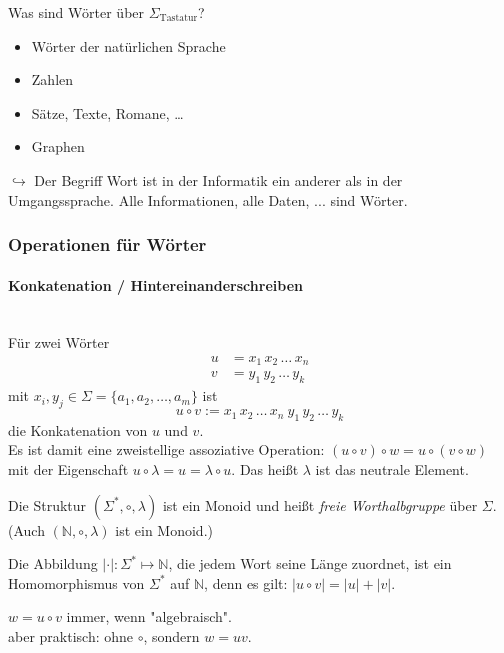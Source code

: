 \documentclass[runningheads,deutsch]{llncs}
\begin{document}
\begin{remark}
    Was sind Wörter über $\Sigma_{\text{Tastatur}}$?
    \begin{itemize}
        \renewcommand{\labelitemi}{$\rightarrow$}
        \item Wörter der natürlichen Sprache
        \item Zahlen
        \item Sätze, Texte, Romane, \dots 
        \item Graphen
    \end{itemize}
    $\hookrightarrow$ Der Begriff Wort ist in der Informatik ein anderer als in der Umgangssprache. Alle Informationen, alle Daten, ... sind Wörter.
\end{remark}

\pagebreak

\subsubsection{Operationen für Wörter}
\paragraph{Konkatenation / Hintereinanderschreiben}\phantom{ }\\
    Für zwei Wörter
    \begin{align*}
        u &= x_1\, x_2\, \dots\, x_n \\
        v &= y_1\, y_2\, \dots\, y_k
    \end{align*}
    mit $x_i, y_j \in \Sigma = \{ a_1, a_2, \dots, a_m \}$ ist
    \[ u \circ v := x_1\, x_2\, \dots\, x_n\  y_1\, y_2\, \dots\, y_k \]
    die Konkatenation von $u$ und $v$.\\
    
    Es ist damit eine zweistellige assoziative Operation: $(u\circ v)\circ w = u \circ (v\circ w)$ mit der Eigenschaft $u\circ \lambda = u = \lambda \circ u$. Das heißt $\lambda$ ist das neutrale Element.

    Die Struktur $(\Sigma^*, \circ, \lambda)$ ist ein Monoid und heißt \textit{freie Worthalbgruppe} über $\Sigma$. (Auch $(\mathbb{N}, \circ, \lambda)$ ist ein Monoid.)

    Die Abbildung $|\cdot|: \Sigma^* \mapsto \mathbb{N}$, die jedem Wort seine Länge zuordnet, ist ein Homomorphismus von $\Sigma^*$ auf $\mathbb{N}$, denn es gilt: $|u \circ v| = |u| + |v|$.

\begin{note}
    $w = u\circ v$ immer, wenn "algebraisch". \\
    aber praktisch: ohne $\circ$, sondern $w = uv$.
\end{note}
\end{document}
